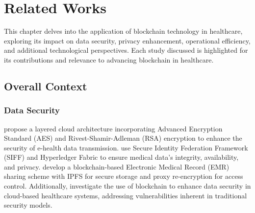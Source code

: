 \documentclass[cic,tc,english]{iiufrgs}
\begin{document}
\chapter{Related Works}
    \label{chap:relatedworks}

    This chapter delves into the application of blockchain technology in healthcare, exploring its impact on data security, privacy enhancement, operational efficiency, and additional technological perspectives. Each study discussed is highlighted for its contributions and relevance to advancing blockchain in healthcare.




    \section{Overall Context}
        \label{sec:overallcontext}
            
        \subsection{Data Security} 
            \citet{Memos2021} propose a layered cloud architecture incorporating Advanced Encryption Standard (AES) and Rivest-Shamir-Adleman (RSA) encryption to enhance the security of e-health data transmission. \citet{Tian2019} use Secure Identity Federation Framework (SIFF) and Hyperledger Fabric to ensure medical data's integrity, availability, and privacy. \citet{Liu2024} develop a blockchain-based Electronic Medical Record (EMR) sharing scheme with IPFS for secure storage and proxy re-encryption for access control. Additionally, \citet{Esposito2018} investigate the use of blockchain to enhance data security in cloud-based healthcare systems, addressing vulnerabilities inherent in traditional security models.
        
\end{document}
